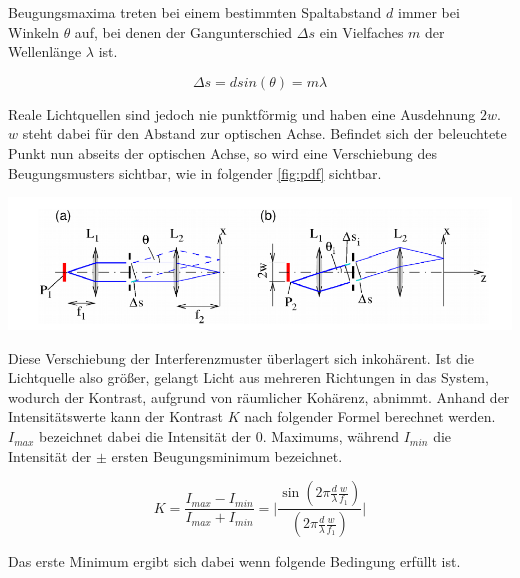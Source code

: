\documentclass[11pt,ngerman]{scrartcl}
\begin{document}
\noindent Beugungsmaxima treten bei einem bestimmten Spaltabstand $d$ immer bei Winkeln
$\theta$ auf, bei denen der Gangunterschied $\Delta s$ ein Vielfaches $m$ der
Wellenlänge $\lambda$ ist.

\begin{equation}
	\Delta s = d sin(\theta) = m \lambda
	\label{eq:wegunterschied}
\end{equation}

\noindent Reale Lichtquellen sind jedoch nie punktförmig und haben eine
Ausdehnung $2w$. $w$ steht dabei für den Abstand zur optischen Achse. Befindet
sich der beleuchtete Punkt nun abseits der optischen Achse, so wird eine
Verschiebung des Beugungsmusters sichtbar, wie in folgender \autoref{fig:pdf}
sichtbar.

\begin{center}
	\begin{minipage}[t]{\textwidth}
		\centering
		\includegraphics[width=\textwidth]{pdf}
		\label{fig:pdf}
	\end{minipage}
\end{center}

\noindent Diese Verschiebung der Interferenzmuster überlagert sich inkohärent. Ist die Lichtquelle also größer, gelangt Licht aus mehreren Richtungen in das System, wodurch der Kontrast, aufgrund von räumlicher Kohärenz, abnimmt. Anhand der Intensitätswerte kann der Kontrast $K$ nach folgender Formel berechnet werden. $I_{max}$ bezeichnet dabei die Intensität der 0. Maximums, während $I_{min}$ die Intensität der $\pm$ ersten Beugungsminimum bezeichnet.

\begin{equation}
	K = \frac{I_{max}-I_{min}}{I_{max}+I_{min}} = \Biggl|\frac{\sin(2\pi\frac{d}{\lambda}\frac{w}{f_1})}{(2\pi\frac{d}{\lambda}\frac{w}{f_1})}\Biggl|
	\label{eq:kontrast}
\end{equation}

\noindent Das erste Minimum ergibt sich dabei wenn folgende Bedingung erfüllt ist.
\end{document}
